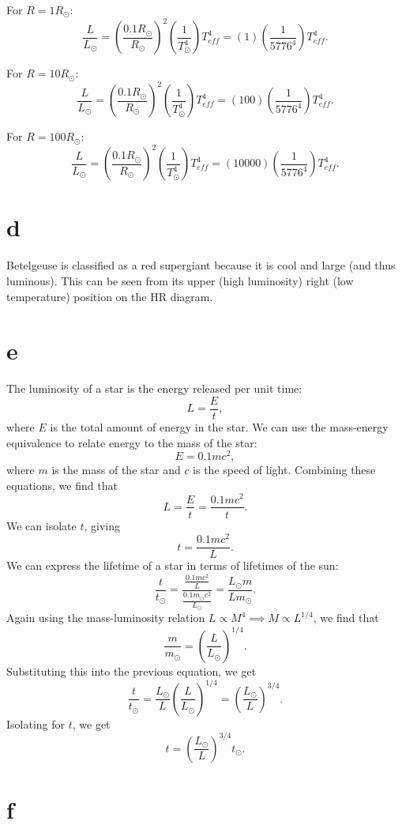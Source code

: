 \documentclass[11pt]{article}
\begin{document}
For \(R=1R_\odot\):
\[\frac{L}{L_\odot} = \left(\frac{0.1R_\odot}{R_\odot}\right)^2\left(\frac{1}{T_\odot^4}\right)T_{eff}^4 = (1)\left(\frac{1}{5776^4}\right)T_{eff}^4.\]

For \(R=10R_\odot\):
\[\frac{L}{L_\odot} = \left(\frac{0.1R_\odot}{R_\odot}\right)^2\left(\frac{1}{T_\odot^4}\right)T_{eff}^4 = (100)\left(\frac{1}{5776^4}\right)T_{eff}^4.\]

For \(R=100R_\odot\):
\[\frac{L}{L_\odot} = \left(\frac{0.1R_\odot}{R_\odot}\right)^2\left(\frac{1}{T_\odot^4}\right)T_{eff}^4 = (10000)\left(\frac{1}{5776^4}\right)T_{eff}^4.\]

    \hypertarget{d}{%
\section*{d}\label{d}}

Betelgeuse is classified as a red supergiant because it is cool and
large (and thus luminous). This can be seen from its upper (high
luminosity) right (low temperature) position on the HR diagram.

    \hypertarget{e}{%
\section*{e}\label{e}}

The luminosity of a star is the energy released per unit time:
\[L = \frac{E}{t},\] where \(E\) is the total amount of energy in the
star. We can use the mass-energy equivalence to relate energy to the
mass of the star: \[E=0.1mc^2,\] where \(m\) is the mass of the star and
\(c\) is the speed of light. Combining these equations, we find that
\[L=\frac{E}{t} = \frac{0.1m c^2}{t}.\] We can isolate \(t\), giving
\[t=\frac{0.1mc^2}{L}.\] We can express the lifetime of a star in terms
of lifetimes of the sun:
\[\frac{t}{t_\odot} = \frac{\frac{0.1mc^2}{L}}{\frac{0.1m_\odot c^2}{L_\odot}} = \frac{L_\odot m}{L m_\odot}.\]
Again using the mass-luminosity relation
\(L \propto M^4 \implies M \propto L^{1/4}\), we find that
\[\frac{m}{m_\odot} = \left(\frac{L}{L_\odot}\right)^{1/4}.\]
Substituting this into the previous equation, we get
\[\frac{t}{t_\odot} = \frac{L_\odot}{L}\left(\frac{L}{L_\odot}\right)^{1/4} = \left(\frac{L_\odot}{L}\right)^{3/4}.\]
Isolating for \(t\), we get
\[t = \left(\frac{L_\odot}{L}\right)^{3/4} t_\odot.\]

    \hypertarget{f}{%
\section*{f}\label{f}}
\end{document}

